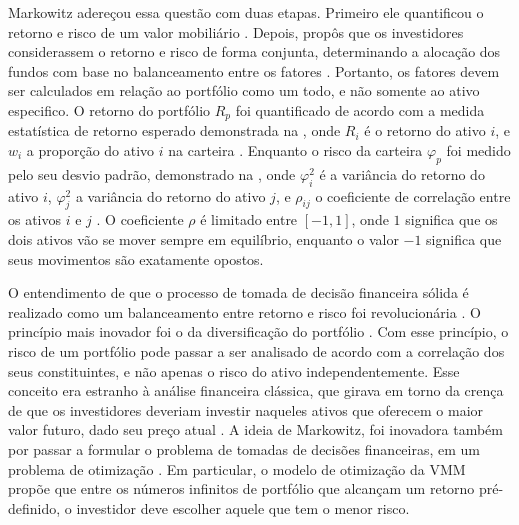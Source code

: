 Markowitz adereçou essa questão com duas etapas. Primeiro ele quantificou o retorno e risco de um valor mobiliário \cite{kolm201460}. Depois, propôs que os investidores considerassem o retorno e risco de forma conjunta, determinando a alocação dos fundos com base no balanceamento entre os fatores \cite{kolm201460}. Portanto, os fatores devem ser calculados em relação ao portfólio como um todo, e não somente ao ativo especifico. O retorno do portfólio $R_p$ foi quantificado de acordo com a medida estatística de retorno esperado demonstrada na , onde $R_i$ é o retorno do ativo $i$, e $w_i$ a proporção do ativo $i$ na carteira \cite{elton2012moderna}. Enquanto o risco da carteira $\displaystyle \varphi_{p}$ foi medido pelo seu desvio padrão, demonstrado na , onde $\varphi_{i}^{2}$ é a variância do retorno do ativo $i$, $\varphi_{j}^{2}$ a variância do retorno do ativo $j$, e $\rho_{ij}$ o coeficiente de correlação entre os ativos $i$ e $j$ \cite{elton2012moderna}. O coeficiente $\rho$ é limitado entre $[-1,1]$, onde $1$ significa que os dois ativos vão se mover sempre em equilíbrio, enquanto o valor $-1$ significa que seus movimentos são exatamente opostos.



O entendimento de que o processo de tomada de decisão financeira sólida é realizado como um balanceamento entre retorno e risco foi revolucionária \cite{kolm201460}. O princípio mais inovador foi o da diversificação do portfólio \cite{kolm201460}. Com esse princípio, o risco de um portfólio pode passar a ser analisado de acordo com a correlação dos seus constituintes, e não apenas o risco do ativo independentemente. Esse conceito era estranho à análise financeira clássica, que girava em torno da crença de que os investidores deveriam investir naqueles ativos que oferecem o maior valor futuro, dado seu preço atual \cite{kolm201460}. A ideia de Markowitz, foi inovadora também por passar a formular o problema de tomadas de decisões financeiras, em um problema de otimização \cite{kolm201460}. Em particular, o modelo de otimização da \acrshort{VMM} propõe que entre os números infinitos de portfólio que alcançam um retorno pré-definido, o investidor deve escolher aquele que tem o menor risco.

